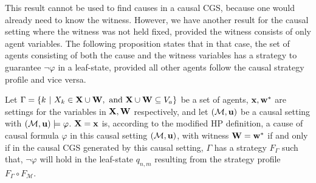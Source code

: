 This result cannot be used to find causes in a causal CGS, because one would already need to know the witness. 
However, we have another result for the causal setting where the witness was not held fixed, provided the witness consists of only agent variables.
The following proposition states that in that case, the set of agents consisting of both the cause and the witness variables has a strategy to guarantee $\neg \varphi$ in a leaf-state, provided all other agents follow the causal strategy profile and vice versa.

\begin{proposition}\label{prop:cause iff superset strat}
    Let $\Gamma = \{ {k \ | \ X_k \in \mathbf{X}\cup \mathbf{W}, \text{ and } \mathbf{X} \cup \mathbf{W} \subseteq V_a} \}$ be a set of agents, $\mathbf{x},\mathbf{w^*}$ are settings for the variables in $\mathbf{X},\mathbf{W}$ respectively, and let $(\mathcal{M},\mathbf{u})$ be a causal setting with $(\mathcal{M},\mathbf{u})\models \varphi$. $\mathbf{X} = \mathbf{x}$ is, according to the modified HP definition, a cause of causal formula $\varphi$ in this causal setting $(\mathcal{M},\mathbf{u})$, with witness $\mathbf{W} = \mathbf{w}^*$ if and only if in the causal CGS generated by this causal setting, $\Gamma$ has a strategy $F_\Gamma$ such that, $\neg \varphi$ will hold in the leaf-state $q_{n,m}$ resulting from the strategy profile $F_\Gamma \circ F_\mathcal{M}$.
\end{proposition}
